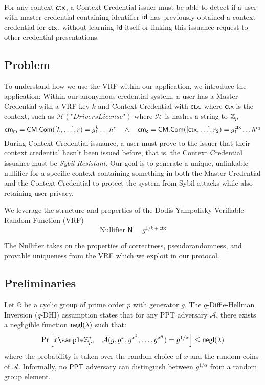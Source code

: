 \begin{definition}
For any context $\mathsf{ctx}$, a Context Credential issuer must be able to detect if a user with master credential containing identifier $\mathsf{id}$ has previously obtained a context credential for $\mathsf{ctx}$, without learning $\mathsf{id}$ itself or linking this issuance request to other credential presentations.
\end{definition}

\subsection{Problem}
To understand how we use the VRF within our application, we introduce the application:
Within our anonymous credential system, a user has a Master Credential with a VRF key $k$ and Context Credential with $\textsf{ctx}$, where $\textsf{ctx}$ is the context, such as $\mathcal{H}(\textit{"DriversLicense"})$ where $\mathcal{H}$ is hashes a string to $\mathbb{Z}_p$
\[
\mathsf{cm}_{\textsf{m}} = \mathsf{CM.Com}([k, \ldots]; r) = g_1^{k}\ldots h^r \quad \wedge \quad \mathsf{cm}_{\textsf{c}} = \mathsf{CM.Com}([\textsf{ctx}, \ldots]; r_2) = g_1^{\textsf{ctx}} \ldots h^{r_2}
\]
During Context Credential issuance, a user must prove to the issuer that their context credential hasn't been issued before, that is, the Context Credential issuance must be \emph{Sybil Resistant}. Our goal is to generate a unique, unlinkable nullifier for a specific context containing something in both the Master Credential and the Context Credential to protect the system from Sybil attacks while also retaining user privacy.

We leverage the structure and properties of the Dodis Yampolisky Verifiable Random Function (VRF)
\[
\text{Nullifier } \textsf{N} = g^{1/k + \textsf{ctx}}
\]

The Nullifier takes on the properties of correctness, pseudorandomness, and provable uniqueness from the VRF which we exploit in our protocol.


\subsection{Preliminaries}

\begin{definition}
Let $\mathbb{G}$ be a cyclic group of prime order $p$ with generator $g$. The $q$-Diffie-Hellman Inversion ($q$-DHI) assumption \cite{mitsunari_new_2002} states that for any PPT adversary $\mathcal{A}$, there exists a negligible function ${\mathsf{negl}(\lambda)}$ such that:
\[
\Pr\left[ x \sample \Zp^*, \quad \mathcal{A}(g, g^x, g^{x^2}, \ldots, g^{x^q}) = g^{1/x} \right] \leq \negl 
\]
where the probability is taken over the random choice of $x$ and the random coins of $\mathcal{A}$. Informally, no $\mathsf{PPT}$ adversary can distinguish between $g^{1/\alpha}$ from a random group element.
\end{definition}

